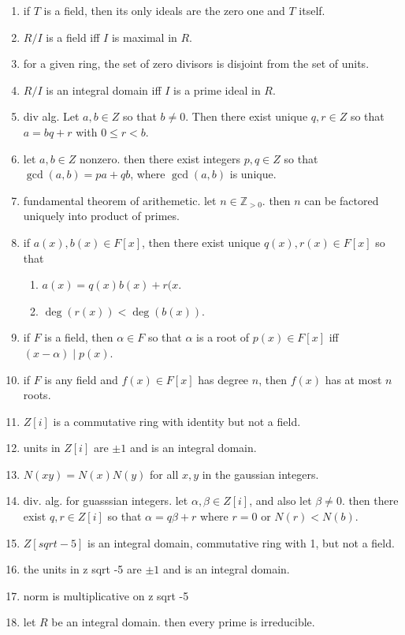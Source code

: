 \begin{enumerate}
	\item if $T$ is a field, then its only ideals are the zero one and $T$ itself. 
	\item $R/I$ is a field iff $I$ is maximal in $R$. 
	\item for a given ring, the set of zero divisors is disjoint from the set of units. 
	\item $R/I$ is an integral domain iff $I$ is a prime ideal in $R$. 
	\item div alg. Let $a,b \in Z$ so that $b \neq 0$. Then there exist unique $q,r \in Z$ so that $a=bq+r$ with $0 \leq r < b$. 
	\item let $a,b \in Z$ nonzero. then there exist integers $p,q \in Z$ so that $\gcd(a,b) = pa+qb$, where $\gcd(a,b)$ is unique. 
	\item fundamental theorem of arithemetic. let $n \in \mathbb{Z}_{>0}$. then $n$ can be factored uniquely into product of primes. 
	\item if $a(x),b(x) \in F[x]$, then there exist unique $q(x),r(x) \in F[x]$ so that 
	\begin{enumerate}
		\item $a(x) = q(x)b(x)+r(x$. 
		\item $\deg(r(x)) < \deg(b(x))$. 
	\end{enumerate}
	\item if $F$ is a field, then $\alpha \in F$ so that $\alpha$ is a root of $p(x) \in F[x]$ iff $(x - \alpha) \mid p(x)$. 
	\item if $F$ is any field and $f(x) \in F[x]$ has degree $n$, then $f(x)$ has at most $n$ roots. 
	\item $Z[i]$ is a commutative ring with identity but not a field. 
	\item units in $Z[i]$ are $\pm 1$ and is an integral domain. 
	\item $N(xy) = N(x)N(y)$ for all $x,y$ in the gaussian integers. 
	\item div. alg. for guasssian integers. let $\alpha,\beta \in Z[i]$, and also let $\beta \neq 0$. then there exist $q,r \in Z[i]$ so that $\alpha = q\beta + r$ where $r = 0$ or $N(r) < N(b)$. 
	\item $Z[sqrt -5]$ is an integral domain, commutative ring with 1, but not a field. 
	\item the units in z sqrt -5 are $\pm 1$ and is an integral domain. 
	\item norm is multiplicative on z sqrt -5
	\item let $R$ be an integral domain. then every prime is irreducible. 

\end{enumerate}
